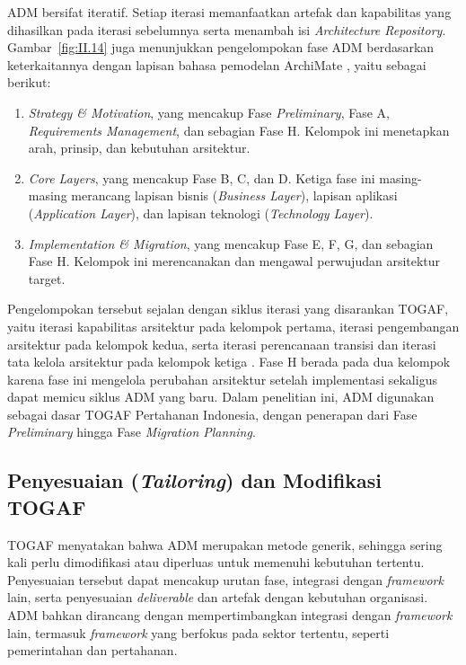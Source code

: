 ADM bersifat iteratif. Setiap iterasi memanfaatkan artefak dan kapabilitas yang dihasilkan pada iterasi sebelumnya serta menambah isi \textit{Architecture Repository}. Gambar~\ref{fig:II.14} juga menunjukkan pengelompokan fase ADM berdasarkan keterkaitannya dengan lapisan bahasa pemodelan ArchiMate \cite{ArchiMate2019}, yaitu sebagai berikut:
\begin{enumerate}[label=\arabic*.]
\item \textit{Strategy \& Motivation}, yang mencakup Fase \textit{Preliminary}, Fase A, \textit{Requirements Management}, dan sebagian Fase H. Kelompok ini menetapkan arah, prinsip, dan kebutuhan arsitektur.
\item \textit{Core Layers}, yang mencakup Fase B, C, dan D. Ketiga fase ini masing-masing merancang lapisan bisnis (\textit{Business Layer}), lapisan aplikasi (\textit{Application Layer}), dan lapisan teknologi (\textit{Technology Layer}).
\item \textit{Implementation \& Migration}, yang mencakup Fase E, F, G, dan sebagian Fase H. Kelompok ini merencanakan dan mengawal perwujudan arsitektur target.
\end{enumerate}

Pengelompokan tersebut sejalan dengan siklus iterasi yang disarankan TOGAF, yaitu iterasi kapabilitas arsitektur pada kelompok pertama, iterasi pengembangan arsitektur pada kelompok kedua, serta iterasi perencanaan transisi dan iterasi tata kelola arsitektur pada kelompok ketiga \cite{TOGAF2022}. Fase H berada pada dua kelompok karena fase ini mengelola perubahan arsitektur setelah implementasi sekaligus dapat memicu siklus ADM yang baru. Dalam penelitian ini, ADM digunakan sebagai dasar TOGAF Pertahanan Indonesia, dengan penerapan dari Fase \textit{Preliminary} hingga Fase \textit{Migration Planning}.

\subsection{Penyesuaian (\textit{Tailoring}) dan Modifikasi TOGAF}
\label{sec:II.5.3}

TOGAF menyatakan bahwa ADM merupakan metode generik, sehingga sering kali perlu dimodifikasi atau diperluas untuk memenuhi kebutuhan tertentu. Penyesuaian tersebut dapat mencakup urutan fase, integrasi dengan \textit{framework} lain, serta penyesuaian \textit{deliverable} dan artefak dengan kebutuhan organisasi. ADM bahkan dirancang dengan mempertimbangkan integrasi dengan \textit{framework} lain, termasuk \textit{framework} yang berfokus pada sektor tertentu, seperti pemerintahan dan pertahanan.


